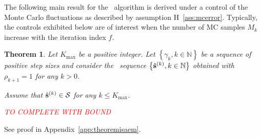 \documentclass[11pt]{article}
\newtheorem{Theorem}{Theorem}
\theoremstyle{t}
\begin{document}
The following main result for the \ISAEM\ algorithm is derived under a control of the Monte Carlo fluctuations as described by assumption H~\ref{ass:mcerror}.
Typically, the controls exhibited below are of interest when the number of MC samples $M_k$ increase with the iteration index $f$.

\begin{Theorem}\label{thm:isaem}
Let $K_{\max }$ be a positive integer. 
Let $\left\{\gamma_{k}, k \in \mathbb{N}\right\}$ be a sequence of positive step sizes and consider the \ISAEM\ sequence $\left\{\hat{\bss}^{(k)}, k \in \mathbb{N}\right\}$ obtained with $\rho_{k+1}=1$ for any $k > 0$.

Assume that $ \hat{\bss}^{(k)} \in \mathcal{S}$ for any $k \leq K_{\max }$.

\textcolor{red}{TO COMPLETE WITH BOUND}

\end{Theorem} 
See proof in Appendix~\ref{app:theoremisaem}.
\end{document}
